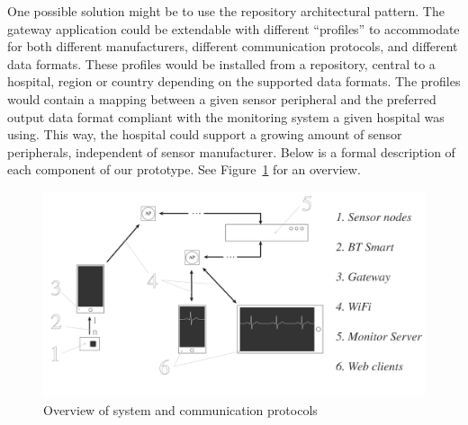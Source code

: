 One possible solution might be to use the repository architectural pattern. The gateway application could be extendable with different ``profiles'' to accommodate for both different manufacturers,  different communication protocols, and different data formats. These profiles would be installed from a repository, central to a hospital, region or country depending on the supported data formats. The profiles would contain a mapping between a given sensor peripheral and the preferred output data format compliant with the monitoring system a given hospital was using. This way, the hospital could support a growing amount of sensor peripherals, independent of sensor manufacturer. Below is a formal description of each component of our prototype. See Figure~\ref{fig:architecture2} for an overview.

\begin{figure}[H]
\centering
\includegraphics[scale=0.3]{img/figures/architecture2.png}
\caption{Overview of system and communication protocols}
\label{fig:architecture2}
\end{figure}



